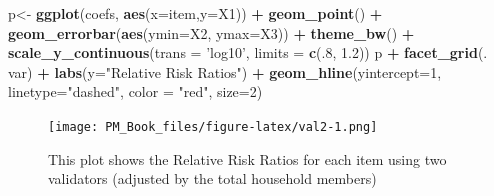 \documentclass[]{book}
\newenvironment{Shaded}{\begin{snugshade}}{\end{snugshade}}
\newcommand{\DataTypeTok}[1]{\textcolor[rgb]{0.13,0.29,0.53}{#1}}
\newcommand{\DecValTok}[1]{\textcolor[rgb]{0.00,0.00,0.81}{#1}}
\newcommand{\FloatTok}[1]{\textcolor[rgb]{0.00,0.00,0.81}{#1}}
\newcommand{\KeywordTok}[1]{\textcolor[rgb]{0.13,0.29,0.53}{\textbf{#1}}}
\newcommand{\NormalTok}[1]{#1}
\newcommand{\OperatorTok}[1]{\textcolor[rgb]{0.81,0.36,0.00}{\textbf{#1}}}
\newcommand{\StringTok}[1]{\textcolor[rgb]{0.31,0.60,0.02}{#1}}
\begin{document}
\begin{Shaded}
\begin{Highlighting}[]
\NormalTok{p<-}\StringTok{ }\KeywordTok{ggplot}\NormalTok{(coefs, }\KeywordTok{aes}\NormalTok{(}\DataTypeTok{x=}\NormalTok{item,}\DataTypeTok{y=}\NormalTok{X1)) }\OperatorTok{+}\StringTok{ }\KeywordTok{geom_point}\NormalTok{() }\OperatorTok{+}\StringTok{  }
\StringTok{  }\KeywordTok{geom_errorbar}\NormalTok{(}\KeywordTok{aes}\NormalTok{(}\DataTypeTok{ymin=}\NormalTok{X2, }\DataTypeTok{ymax=}\NormalTok{X3)) }\OperatorTok{+}
\StringTok{ }\KeywordTok{theme_bw}\NormalTok{() }\OperatorTok{+}\StringTok{ }\KeywordTok{scale_y_continuous}\NormalTok{(}\DataTypeTok{trans =} \StringTok{'log10'}\NormalTok{, }\DataTypeTok{limits =} \KeywordTok{c}\NormalTok{(.}\DecValTok{8}\NormalTok{, }\FloatTok{1.2}\NormalTok{))}
\NormalTok{p }\OperatorTok{+}\StringTok{ }\KeywordTok{facet_grid}\NormalTok{(. }\OperatorTok{~}\StringTok{ }\NormalTok{var) }\OperatorTok{+}\StringTok{ }\KeywordTok{labs}\NormalTok{(}\DataTypeTok{y=}\StringTok{"Relative Risk Ratios"}\NormalTok{) }\OperatorTok{+}\StringTok{ }\KeywordTok{geom_hline}\NormalTok{(}\DataTypeTok{yintercept=}\DecValTok{1}\NormalTok{, }\DataTypeTok{linetype=}\StringTok{"dashed"}\NormalTok{,}
                \DataTypeTok{color =} \StringTok{"red"}\NormalTok{, }\DataTypeTok{size=}\DecValTok{2}\NormalTok{)}
\end{Highlighting}
\end{Shaded}

\begin{figure}
\centering
\texttt{[image: PM\_Book\_files/figure-latex/val2-1.png]}
\caption{\label{fig:val2}This plot shows the Relative Risk Ratios for each item using two validators (adjusted by the total household members)}
\end{figure}
\end{document}
